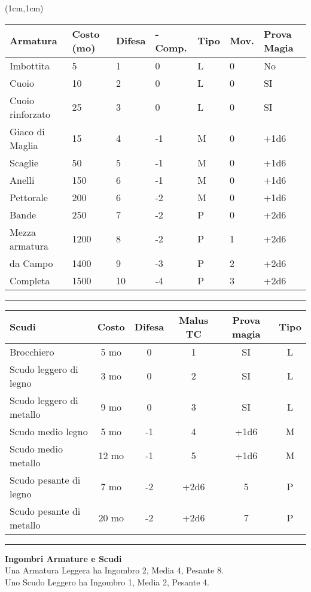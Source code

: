 \documentclass[a4paper,12 pt,openany]{book}
\newcommand{\riga}{\rule{\textwidth}{0.4pt}}
\begin{document}
\begin{textblock*}{15cm}(1cm,1cm) %

\begin{tabular}{lllllll}
\textbf{Armatura} & \textbf{Costo (mo)} & \textbf{Difesa} & \textbf{-Comp.} &  \textbf{Tipo} & \textbf{Mov.} & \textbf{Prova Magia}\\
\hline
Imbottita   & 5    & 1   & 0  &  L   & 0   & No\\
Cuoio   & 10   & 2   & 0   & L   & 0   & SI\\
Cuoio rinforzato   & 25  &3  & 0   &    L   & 0 &SI \\
Giaco di Maglia   & 15   & 4  & -1  &  M   & 0  &+1d6\\
Scaglie& 50   & 5  & -1  &  M   & 0 &+1d6 \\
Anelli & 150  & 6  & -1  &  M   & 0  &+1d6\\
Pettorale    & 200  & 6  & -2  &  M  &  0 &+1d6 \\
Bande   & 250  & 7  & -2  &  P   & 0  &+2d6 \\
Mezza armatura   & 1200 & 8  & -2  &  P   & 1 &+2d6  \\
da Campo& 1400 & 9 & -3  &   P   & 2  &+2d6 \\
Completa& 1500 & 10  & -4  & P   & 3  &+2d6 \\
\end{tabular}

\riga

\begin{tabular}{lccccc}
\textbf{Scudi} & \textbf{Costo} & \textbf{Difesa} & \textbf{Malus TC} & \textbf{Prova magia} & \textbf{Tipo}\\
\hline
Brocchiero& 5 mo  &  0& 1& SI& L\\
Scudo leggero di legno   & 3 mo  &  0& 2& SI  & L\\
Scudo leggero di metallo & 9  mo  &  0& 3&SI  & L\\
Scudo medio legno   & 5 mo   &  -1& 4& +1d6  & M\\
Scudo medio metallo & 12 mo  & -1  & 5& +1d6  & M\\
Scudo pesante di legno   & 7  mo  &  -2    & +2d6&5  & P\\
Scudo pesante di metallo & 20 mo  &  -2    & +2d6&7  & P\\
\end{tabular}

\riga

\textbf{Ingombri Armature e Scudi}\\
Una Armatura Leggera ha Ingombro 2, Media 4, Pesante 8.\\
Uno Scudo Leggero ha Ingombro 1, Media 2, Pesante 4.


\end{textblock*}
\end{document}

